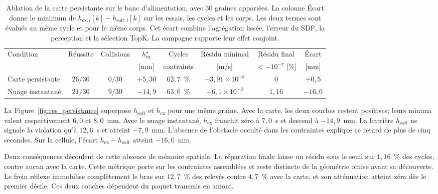 \begin{table}[htbp]
\centering
\caption[Ablation de la carte persistante (alimentation)]{Ablation de la carte persistante sur le banc d'alimentation, avec $30$ graines appariées. La colonne Écart donne le minimum de $h_{\mathrm{ex},l}[k]-h_{\mathrm{soft},l}[k]$ sur les essais, les cycles et les corps. Les deux termes sont évalués au même cycle et pour le même corps. Cet écart combine l'agrégation lissée, l'erreur du \ac{SDF}, la perception et la sélection TopK. La campagne rapporte leur effet conjoint.}
\label{tab:res_abl_persistance}
\scriptsize
\setlength{\tabcolsep}{2.5pt}
\begin{tabular}{lccccccc}
\toprule
Condition & Réussite & Collisions & $h_{\mathrm{ex}}^{\star}$ & Cycles & Résidu minimal & Résidu final & Écart \\
 & & & [mm] & contraints & [m/s] & $<-10^{-7}$ [\%] & [mm] \\
\midrule
Carte persistante  & $26/30$ & $0/30$ & $+5{,}30$ & $62{,}7$~\% & $-3{,}91\times10^{-8}$ & $0$ & $+0{,}5$  \\
Nuage instantané   & $21/30$ & $9/30$ & $-14{,}9$ & $63{,}0$~\% & $-6{,}1\times10^{-2}$ & $1{,}16$ & $-16{,}0$ \\
\bottomrule
\end{tabular}
\end{table}

La Figure~\ref{fig:res_persistance} superpose $h_{\mathrm{soft}}$ et $h_{\mathrm{ex}}$ pour une même graine. Avec la carte, les deux courbes restent positives; leurs minima valent respectivement $6{,}0$ et $8{,}0$~mm. Avec le nuage instantané, $h_{\mathrm{ex}}$ franchit zéro à $7{,}0$~s et descend à $-14{,}9$~mm. La barrière $h_{\mathrm{soft}}$ ne signale la violation qu'à $12{,}6$~s et atteint $-7{,}9$~mm. L'absence de l'obstacle occulté dans les contraintes explique ce retard de plus de cinq secondes. Sur la cellule, l'écart $h_{\mathrm{ex}}-h_{\mathrm{soft}}$ atteint $-16{,}0$~mm.

Deux conséquences découlent de cette absence de mémoire spatiale. La réparation finale laisse un résidu sous le seuil sur $1{,}16$~\% des cycles, contre aucun avec la carte. Cette métrique porte sur les contraintes assemblées et reste distincte de la géométrie omise avant sa découverte. Le frein réflexe immobilise complètement le bras sur $12{,}7$~\% des relevés contre $4{,}7$~\% avec la carte, et son atténuation atteint zéro dès le premier décile. Ces deux couches dépendent du paquet transmis en amont.

